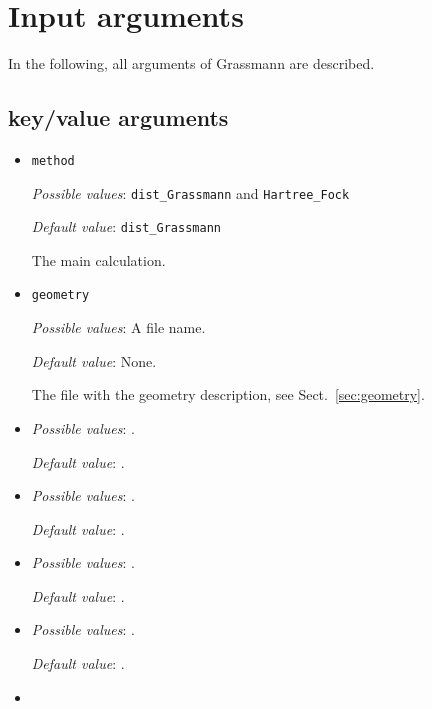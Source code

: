 \section{Input arguments}
\label{sec:inputargs}

In the following, all arguments of Grassmann are described.

\subsection{key/value arguments}

\begin{itemize}
\item \verb+method+

  \emph{Possible values}: \verb+dist_Grassmann+ and \verb+Hartree_Fock+

  \emph{Default value}: \verb+dist_Grassmann+

  The main calculation.

\item \verb+geometry+

  \emph{Possible values}: A file name.

  \emph{Default value}: None.

  The file with the geometry description, see Sect.~\ref{sec:geometry}.

\item \verb++

  \emph{Possible values}: .

  \emph{Default value}: .


\item \verb++

  \emph{Possible values}: .

  \emph{Default value}: .


\item \verb++

  \emph{Possible values}: .

  \emph{Default value}: .


\item \verb++

  \emph{Possible values}: .

  \emph{Default value}: .

\item \verb++


\end{itemize}

